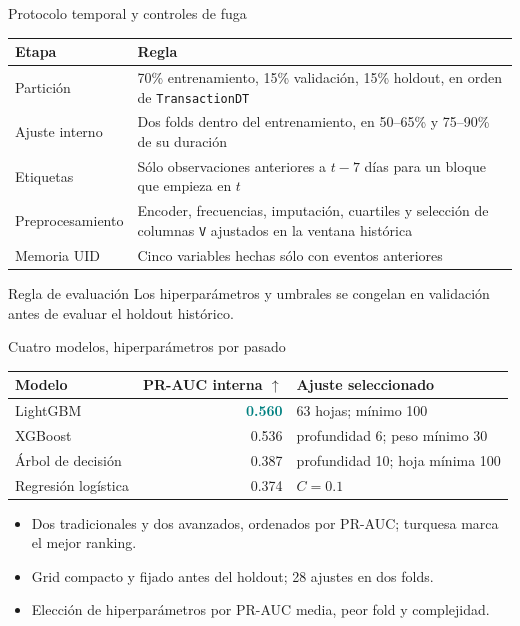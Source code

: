 \documentclass[aspectratio=169,11pt]{beamer}
\begin{document}
\begin{frame}{Protocolo temporal y controles de fuga}\small
\begin{tabularx}{\linewidth}{@{}p{.25\linewidth}Y@{}}\toprule
Etapa & Regla\\\midrule
Partición & 70\% entrenamiento, 15\% validación, 15\% holdout, en orden de \texttt{TransactionDT}\\
Ajuste interno & Dos folds dentro del entrenamiento, en 50--65\% y 75--90\% de su duración\\
Etiquetas & Sólo observaciones anteriores a $t-7$ días para un bloque que empieza en $t$\\
Preprocesamiento & Encoder, frecuencias, imputación, cuartiles y selección de columnas \texttt{V} ajustados en la ventana histórica\\
Memoria UID & Cinco variables hechas sólo con eventos anteriores\\\bottomrule
\end{tabularx}
\vspace{4mm}
\begin{block}{Regla de evaluación}
Los hiperparámetros y umbrales se congelan en validación antes de evaluar el holdout histórico.
\end{block}
\end{frame}

\begin{frame}{Cuatro modelos, hiperparámetros por pasado}\small
\begin{tabular}{@{}lrl@{}}\toprule
Modelo & PR-AUC interna $\uparrow$ & Ajuste seleccionado\\\midrule
LightGBM & \textcolor{teal}{\textbf{0.560}} & 63 hojas; mínimo 100\\
XGBoost & 0.536 & profundidad 6; peso mínimo 30\\
Árbol de decisión & 0.387 & profundidad 10; hoja mínima 100\\
Regresión logística & 0.374 & $C=0.1$\\\bottomrule
\end{tabular}
\par
\vspace{6mm}
\begin{itemize}
\item Dos tradicionales y dos avanzados, ordenados por PR-AUC; turquesa marca el mejor ranking.
\item Grid compacto y fijado antes del holdout; 28 ajustes en dos folds.
\item Elección de hiperparámetros por PR-AUC media, peor fold y complejidad.
\end{itemize}
\end{frame}
\end{document}
